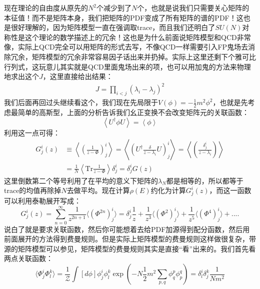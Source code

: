 现在理论的自由度从原先的$N^2$个减少到了$N$个，也就是说我们只需要关心矩阵的本征值！而不是矩阵本身，我们把矩阵的PDF变成了所有矩阵的谱的PDF！这也是很好理解的，因为矩阵模型一直在强调取trace，而且我们还明白了$SU(N)$对称性是这个理论的数学描述上的冗余！这也是为什么前面说矩阵模型和QCD非常像，实际上QCD完全可以用矩阵的形式去写，不像QCD一样需要引入FP鬼场去消除冗余，矩阵模型的冗余非常容易因子话出来并扔掉。实际上这里还剩下个雅可比行列式，这玩意儿其实就是QCD里面鬼场出来的项，也可以用加鬼的方法来物理地求出这个$J$，这里直接给出结果：
\begin{equation}
	\begin{aligned}J=\prod_{i<j}(\lambda_i-\lambda_j)^2\end{aligned}
\end{equation}
我们后面再回过头继续看这个，我们现在先局限于$V(\phi)=-\frac12m^2\phi^2$，也就是先考虑最简单的高斯型，上面的分析告诉我们幺正变换不会改变矩阵元的关联函数：
\begin{equation}
	\left<U^\dagger \phi U\right>=\left<\phi\right>
\end{equation}
利用这一点可得：
\begin{equation}
\begin{aligned}
		G^i_j(z)&\equiv\left<\left(\frac1{z-\Phi}\right)^i_j\right>=\left<\left(U^\dagger\frac{\delta}{z-\lambda_i} U\right)^i_j\right>=\left<\left(\frac{\delta^i_j}{z-\lambda_i}\right)\right>\\
	&=\frac1N\left\langle\text{Tr}\frac1{z-\Phi} \right\rangle\delta^i_j=\delta^i_j G(z)
\end{aligned}
\end{equation}
这里倒数第二个等号利用了在平均的意义下矩阵的$\lambda_N$都是相等的，所以都等于trace的均值再除掉$N$去做平均。现在计算$\rho(E)$约化为计算$G^{i}_j(z)$，而这一函数可以利用泰勒展开写成：
\begin{equation}
	G_j^i(z)=\sum_{n=0}^\infty\frac{1}{z^{2n+1}}\langle\left(\Phi^{2n}\right)_j^i\rangle=\delta_j^i\frac{1}{z}+\frac{1}{z^3}\langle\left(\Phi^2\right)_j^i\rangle+\frac{1}{z^5}\langle\left(\Phi^4\right)_j^i\rangle+....
\end{equation}
说白了就是要求关联函数，然后你可能想着去给PDF加源得到配分函数，然后用前面展开的方法得到费曼规则。但是实际上矩阵模型的费曼规则这样做很复杂，带源的矩阵模型可以参见\cite{Brezin:2016eax}，矩阵模型的费曼规则其实是直接“看”出来的。我们首先看两点关联函数：
\begin{equation}
	\langle\Phi_j^i\Phi_l^k\rangle=\frac1{\mathcal{Z}}\int[d\phi]\phi_j^i\phi_l^k\exp\left(-N\frac12m^2\sum_{p,q}\phi_q^p\phi_p^q\right)=\delta_l^i\delta_j^k\frac1{Nm^2}
\end{equation}
